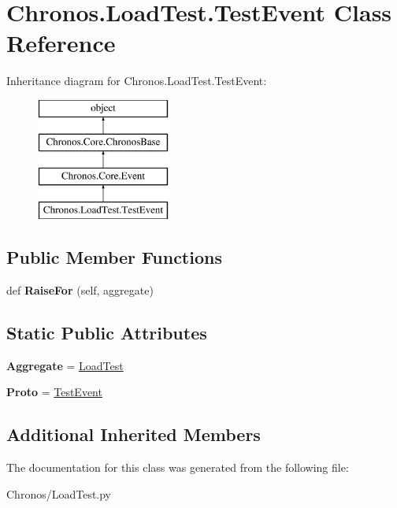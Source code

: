 \hypertarget{classChronos_1_1LoadTest_1_1TestEvent}{}\section{Chronos.\+Load\+Test.\+Test\+Event Class Reference}
\label{classChronos_1_1LoadTest_1_1TestEvent}
Inheritance diagram for Chronos.\+Load\+Test.\+Test\+Event\+:\begin{figure}[H]
\begin{center}
\leavevmode
\includegraphics[height=4.000000cm]{classChronos_1_1LoadTest_1_1TestEvent}
\end{center}
\end{figure}
\subsection*{Public Member Functions}
\begin{DoxyCompactItemize}
\item 
def {\bfseries Raise\+For} (self, aggregate)\hypertarget{classChronos_1_1LoadTest_1_1TestEvent_ae7f6601c321a8ae2fb61b59e7eb4bed8}{}\label{classChronos_1_1LoadTest_1_1TestEvent_ae7f6601c321a8ae2fb61b59e7eb4bed8}

\end{DoxyCompactItemize}
\subsection*{Static Public Attributes}
\begin{DoxyCompactItemize}
\item 
{\bfseries Aggregate} = \hyperlink{classChronos_1_1LoadTest_1_1LoadTest}{Load\+Test}\hypertarget{classChronos_1_1LoadTest_1_1TestEvent_a5c3c60d7ab04416482d7103628bc55dd}{}\label{classChronos_1_1LoadTest_1_1TestEvent_a5c3c60d7ab04416482d7103628bc55dd}

\item 
{\bfseries Proto} = \hyperlink{classChronos_1_1LoadTest_1_1TestEvent}{Test\+Event}\hypertarget{classChronos_1_1LoadTest_1_1TestEvent_a208b564c6f4f45046770b96ed0bedab1}{}\label{classChronos_1_1LoadTest_1_1TestEvent_a208b564c6f4f45046770b96ed0bedab1}

\end{DoxyCompactItemize}
\subsection*{Additional Inherited Members}


The documentation for this class was generated from the following file\+:\begin{DoxyCompactItemize}
\item 
Chronos/Load\+Test.\+py\end{DoxyCompactItemize}
